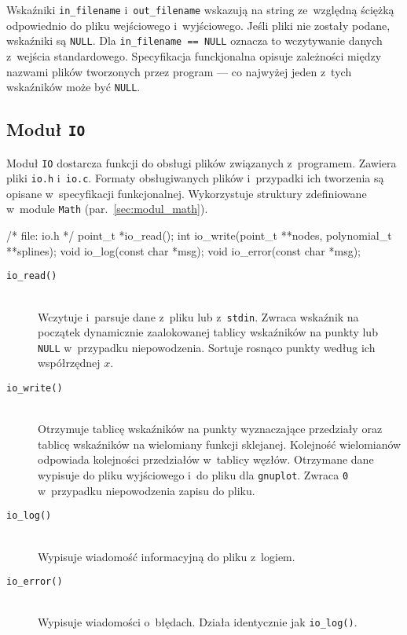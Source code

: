 \documentclass[12pt,a4paper]{article}
\newcommand{\p}[1]{\texttt{#1}}
\begin{document}
Wskaźniki \p{in\_filename} i~\p{out\_filename} wskazują na string ze~względną
ściężką odpowiednio do pliku wejściowego i~wyjściowego. Jeśli pliki nie
zostały podane, wskaźniki są \p{NULL}. Dla \p{in\_filename == NULL} oznacza to
wczytywanie danych z~wejścia standardowego. Specyfikacja funckjonalna opisuje
zależności między nazwami plików tworzonych przez program --- co najwyżej jeden
z~tych wskaźników może być \p{NULL}.

\subsection{Moduł \p{IO}}

Moduł \p{IO} dostarcza funkcji do obsługi plików związanych z~programem.
Zawiera pliki \p{io.h} i~\p{io.c}. Formaty obsługiwanych plików i~przypadki ich
tworzenia są opisane w~specyfikacji funkcjonalnej. Wykorzystuje struktury
zdefiniowane w~module \p{Math} (par.~\ref{sec:modul_math}).
\begin{SmallVerbatim}
    /* file: io.h */
    point_t *io_read();
    int io_write(point_t **nodes, polynomial_t **splines);
    void io_log(const char *msg);
    void io_error(const char *msg);
\end{SmallVerbatim}
\begin{description}
  \item[\p{io\_read()}] \hfill \\
    Wczytuje i~parsuje dane z~pliku lub z~\p{stdin}. Zwraca wskaźnik na
    początek dynamicznie zaalokowanej tablicy wskaźników na punkty lub \p{NULL}
    w~przypadku niepowodzenia. Sortuje rosnąco punkty według ich współrzędnej
    $x$.
  \item[\p{io\_write()}] \hfill \\
    Otrzymuje tablicę wskaźników na punkty wyznaczające przedziały oraz tablicę
    wskaźników na wielomiany funkcji sklejanej. Kolejność wielomianów odpowiada
    kolejności przedziałów w~tablicy węzłów. Otrzymane dane wypisuje do pliku
    wyjściowego i~do pliku dla \p{gnuplot}. Zwraca \p{0} w~przypadku
    niepowodzenia zapisu do pliku.
  \item[\p{io\_log()}] \hfill \\
    Wypisuje wiadomość informacyjną do pliku z~logiem.
  \item[\p{io\_error()}] \hfill \\
    Wypisuje wiadomości o~błędach. Działa identycznie jak \p{io\_log()}.
\end{description}
\end{document}
